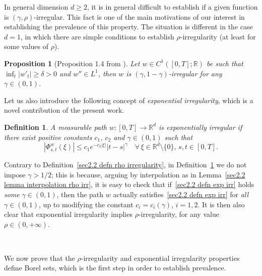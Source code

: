 \documentclass[10pt]{article}
\newcommand{\tmtextit}[1]{{\itshape{#1}}}
\newtheorem{definition}[theorem]{Definition}
\newtheorem{proposition}[theorem]{Proposition}
\begin{document}
In general dimension $d \geqslant 2$, it is in general difficult to establish
if a given function is $(\gamma, \rho)$\mbox{-}irregular. This fact is one of
the main motivations of our interest in establishing the prevalence of this
property. The situation is different in the case $d = 1$, in which there are
simple conditions to establish $\rho$\mbox{-}irregularity (at least for some
values of $\rho$).

\begin{proposition}[Proposition 1.4 from {\cite{choukgubinelli1}}]
  \label{sec2.2 prop d=1}Let $w \in C^1 ([0, T] ; \mathbb{R})$ be such that
  $\inf_t | w'_t | \geqslant \delta > 0$ and $w'' \in L^1$, then $w$ is
  $(\gamma, 1 - \gamma)$\mbox{-}irregular for any $\gamma \in (0, 1)$.
\end{proposition}

Let us also introduce the following concept of \tmtextit{exponential
irregularity}, which is a novel contribution of the present work.

\begin{definition}
  \label{sec2.2 defn exp irregularity}A measurable path $w : [0, T]
  \rightarrow \mathbb{R}^d$ is exponentially irregular if there exist positive
  constants $c_1$, $c_2$ and $\gamma \in (0, 1)$ such that
  \begin{equation}
    | \Phi^w_{s, t} (\xi) | \leqslant c_1 e^{- c_2 | \xi |} | t - s |^{\gamma}
    \quad \forall \, \xi \in \mathbb{R}^d \setminus \{ 0 \}, \, s, t \in [0,
    T] . \label{sec2.2 defn exp irr}
  \end{equation}
\end{definition}

Contrary to Definition~\ref{sec2.2 defn rho irregularity}, in
Definition~\ref{sec2.2 defn exp irregularity} we do not impose $\gamma > 1 /
2$; this is because, arguing by interpolation as in Lemma~\ref{sec2.2 lemma
interpolation rho irr}, it is easy to check that if~\eqref{sec2.2 defn exp
irr} holds \tmtextit{some} $\gamma \in (0, 1)$, then the path $w$ actually
satisfies~\eqref{sec2.2 defn exp irr} for \tmtextit{all} $\gamma \in (0, 1)$,
up to modifying the constant $c_i = c_i (\gamma)$, $i = 1, 2$. It is then also
clear that exponential irregularity implies $\rho$-irregularity, for any value
$\rho \in (0, + \infty)$.

\

We now prove that the $\rho$\mbox{-}irregularity and exponential irregularity
properties define Borel sets, which is the first step in order to establish
prevalence.
\end{document}
